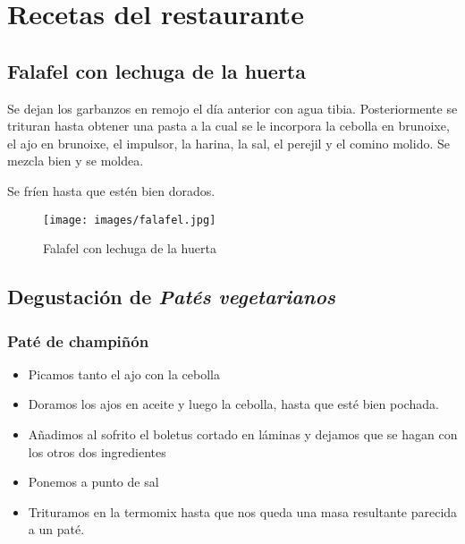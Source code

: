 \chapter{Recetas del restaurante}
\label{chap:recetas}

\section{Falafel con lechuga de la huerta}
\label{sec:falafel}

Se dejan los garbanzos en remojo el día anterior con agua tibia. Posteriormente se trituran hasta obtener una pasta a la cual se le incorpora la cebolla en brunoixe, el ajo en brunoixe, el impulsor, la harina, la  sal, el perejil y el comino molido. Se mezcla bien y se moldea.

Se fríen hasta que estén bien dorados.

\begin{figure}[h]
  \begin{center}
    \texttt{[image: images/falafel.jpg]}
    \caption{Falafel con lechuga de la huerta}
    \label{fig:falafel}
  \end{center}
\end{figure}

\section{Degustación de \emph{Patés vegetarianos}}
\label{sec:pates}

\subsection{Paté de champiñón}
\label{sec:patechampi}
\begin{itemize}
\item Picamos tanto el ajo con la cebolla
\item Doramos los ajos en aceite y luego la cebolla, hasta que esté bien pochada.
\item Añadimos al sofrito el boletus cortado en láminas y dejamos que se hagan con los otros dos ingredientes
\item Ponemos a punto de sal
\item Trituramos en la termomix hasta que nos queda una masa resultante parecida a un paté.
\end{itemize}

